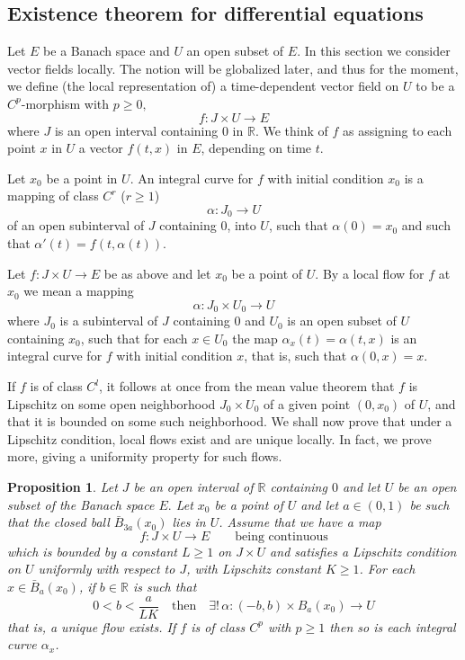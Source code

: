 \documentclass[a5paper,10pt,twoside]{article}
\newcommand{\R}{\ensuremath{\mathbb{R}}}
\theoremstyle{plain}
\newtheorem{prop}[teo]{Proposition}
\theoremstyle{definition}
\theoremstyle{remark}
\begin{document}
\subsection{Existence theorem for differential equations}
Let $E$ be a Banach space and $U$ an open subset of $E.$ In this section we consider vector fields locally. The notion will be globalized later, and thus for the moment, we define (the local representation of) a time-dependent vector field on $U$ to be a $C^p$-morphism with $p\geq 0,$
$$
f: J\times U\to E
$$
where $J$ is an open interval containing $0$ in $\R$. We think of $f$ as assigning to each point $x$ in $U$ a vector $f(t,x)$ in $E$, depending on time $t.$

Let $x_0$ be a point in $U$. An integral curve for $f$ with initial condition $x_0$ is a mapping of class $C^r$ ($r\geq 1$)
$$
\alpha: J_0\to U
$$
of an open subinterval of $J$ containing $0$, into $U$, such that $\alpha(0)=x_0$ and such that $\alpha'(t)=f(t,\alpha(t))$. 

Let $f:J\times U\to E$ be as above and let $x_0$ be a point of $U$. By a local flow for $f$ at $x_0$ we mean a mapping
$$
\alpha:J_0\times U_0\to U
$$
where $J_0$ is  a subinterval of $J$ containing $0$ and $U_0$ is an open subset of $U$ containing $x_0$, such that for each $x\in U_0$ the map $\alpha_x(t)=\alpha(t,x)$ is an integral curve for $f$ with initial condition $x$, that is, such that $\alpha(0,x)=x.$

If $f$ is of class $C^l$, it follows at once from the mean value theorem that $f$ is Lipschitz on some open neighborhood $J_0\times U_0$ of a given point $(0, x_0)$ of $U$, and that it is bounded on some such neighborhood. We shall now prove that under a Lipschitz condition, local flows exist and are unique locally. In fact, we prove more, giving a uniformity property for such flows.

\begin{prop}
Let $J$ be an open interval of $\R$ containing $0$ and let $U$ be an open subset of the Banach space $E.$ Let $x_0$ be  a point of $U$ and let $a\in(0,1)$ be such that the closed ball $\bar{B}_{3a}(x_0)$ lies in $U$. Assume that we have a map 
$$
f: J\times U\to E \qquad \text{being continuous}
$$
which is bounded by a constant $L\geq 1$ on $J\times U$ and satisfies a Lipschitz condition on $U$ uniformly with respect to $J$, with Lipschitz constant $K\geq 1$. For each $x\in\bar{B}_a(x_0)$, if $b\in \R$ is such that 
$$
0<b<\frac{a}{LK} \quad\mathrm{then}\quad \exists!\, \alpha :(-b,b)\times B_a(x_0)\to U
$$
that is, a unique flow exists. If $f$ is of class $C^p$ with $p\geq 1$ then so is each integral curve $\alpha_x$.
\end{prop}
\end{document}
